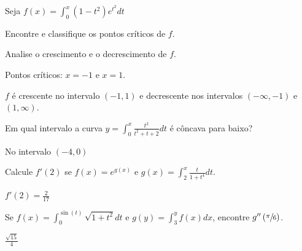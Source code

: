 \begin{exercises}
\begin{exercise}
Seja \(f(x)=\int_0^x (1-t^2)e^{t^2} dt\)
\begin{alphalist}
  \item Encontre  e classifique os pontos críticos de $f$.
  \item Analise o crescimento e o decrescimento de $f$.
\end{alphalist}
\begin{answer}
  \begin{alphalist}
    \item Pontos críticos: $x=-1$ e $x=1$.
    \item $f$ é crescente no intervalo $(-1,1)$ e decrescente nos
          intervalos $(-\infty,-1)$ e $(1, \infty)$.
  \end{alphalist}
\end{answer}
\end{exercise}

\begin{exercise}
Em qual intervalo a curva \(y= \int_0^x \frac{t^2}{t^2+t+2} dt\)
é côncava para baixo?
\begin{answer}
  No intervalo $(-4,0)$
\end{answer}
\end{exercise}

\begin{exercise}
Calcule $f'(2)$ se $f(x)= e^{g(x)}$ e \(g(x)= \int_2^x \frac{t}{1+t^4}dt\).
\begin{answer}
  $f'(2)=\frac{2}{17}$
\end{answer}
\end{exercise}

\begin{exercise}
Se \(f(x)= \int_0^{\sin(t)} \sqrt{1+t^2} dt\)
e  \(g(y)= \int_3^y f(x)dx\),
encontre \(g''\left(\sfrac{\pi}{6}\right)\).
\begin{answer}
  $\frac{\sqrt{15}}{4}$
\end{answer}
\end{exercise}


\end{exercises}
